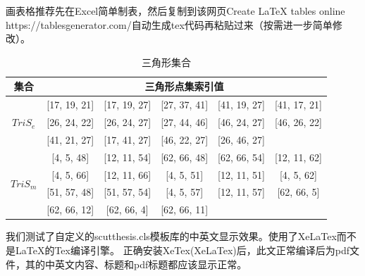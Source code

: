 \documentclass[unicode,pdfcover]{scutthesis}
\begin{document}
画表格推荐先在Excel简单制表，然后复制到该网页{Create LaTeX tables online https://tablesgenerator.com/}自动生成tex代码再粘贴过来（按需进一步简单修改）。
\begin{table}[htp]
\small%
\centering
\caption{三角形集合}
\label{T23}
\begin{tabular}{c|ccccc}\hline
 集合 & \multicolumn{5}{c}{三角形点集索引值} \\ \hline
\multirow{3}{*}{$TriS_{e}$} & [17, 19, 21] & [17, 19, 27] & [27, 37, 41] & [41, 19, 27] & [41, 17, 21] \\ %
                      & [26, 24, 22] & [26, 24, 27] & [27, 44, 46] & [46, 24, 27] & [46, 26, 22] \\ %
                      & [41, 21, 27] & [17, 41, 27] & [46, 22, 27] & [26, 46, 27] &            \\ \hline
\multirow{4}{*}{$TriS_{m}$} & [4, 5, 48]   & [12, 11, 54] & [62, 66, 48] & [62, 66, 54] & [12, 11, 62] \\ %
                      & [4, 5, 66]   & [12, 11, 66] & [4, 5, 51]   & [12, 11, 51] & [4, 5, 62]   \\ %
                      & [51, 57, 48] & [51, 57, 54] & [4, 5, 57]   & [12, 11, 57] & [62, 66, 5]  \\ %
                      & [62, 66, 12] & [62, 66, 4]  & [62, 66, 11] &             &             \\ \hline
\end{tabular}
\end{table}



我们测试了自定义的scutthesis.cls模板库的中英文显示效果。使用了XeLaTex而不是\LaTeX{}的Tex编译引擎。
正确安装XeTex(XeLaTex)后，此文正常编译后为pdf文件，其的中英文内容、标题和pdf标题都应该显示正常。


\backmatter



\setcounter{table}{0}
\setcounter{figure}{0}
\setcounter{equation}{0}
\renewcommand{\theequation}{\textbf{A}-\arabic{equation}}%
\renewcommand{\thetable}{\textbf{A}-\arabic{table}}%
\renewcommand{\thefigure}{\textbf{A}-\arabic{figure}}%
%
\end{document}

